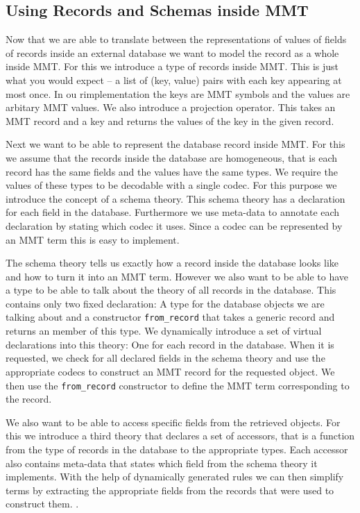 \documentclass{deliverablereport}
\begin{document}
\subsection{Using Records and Schemas inside MMT}

Now that we are able to translate between the representations of values of fields of records inside an external database we want to model the record as a whole inside MMT. For this we introduce a type of records inside MMT. This is just what you would expect -- a list of (key, value) pairs with each key appearing at most once. In ou rimplementation the keys are MMT symbols and the values are arbitary MMT values. We also introduce a projection operator. This takes an MMT record and a key and returns the values of the key in the given record.

Next we want to be able to represent the database record inside MMT. For this we assume that the records inside the database are homogeneous, that is each record has the same fields and the values have the same types. We require the values of these types to be decodable with a single codec. For this purpose we introduce the concept of a schema theory. This schema theory has a declaration for each field in the database. Furthermore we use meta-data to annotate each declaration by stating which codec it uses. Since a codec can be represented by an MMT term this is easy to implement.

The schema theory tells us exactly how a record inside the database looks like and how to turn it into an MMT term. However we also want to be able to have a type to be able to talk about the theory of all records in the database. This contains only two fixed declaration: A type for the database objects we are talking about and a constructor \texttt{from\_record} that takes a generic record and returns an member of this type. We dynamically introduce a set of virtual declarations into this theory: One for each record in the database. When it is requested, we check for all declared fields in the schema theory and use the appropriate codecs to construct an MMT record for the requested object. We then use the  \texttt{from\_record} constructor to define the MMT term corresponding to the record.

We also want to be able to access specific fields from the retrieved objects. For this we introduce a third theory that declares a set of accessors, that is a function from the type of records in the database to the appropriate types. Each accessor also contains meta-data that states which field from the schema theory it implements. With the help of dynamically generated rules we can then simplify terms by extracting the appropriate fields from the records that were used to construct them. .
\end{document}
